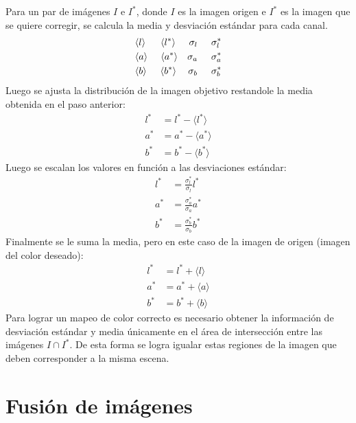 Para un par de imágenes $I$ e $I^*$, donde $I$ es la imagen origen e $I^*$ es la imagen que se quiere corregir, se calcula la media y desviación estándar para cada canal.
\begin{align*}
&{\langle l \rangle} \hspace{0.55cm} {\langle l^* \rangle}  &{ \sigma_l } \hspace{0.5cm} { \sigma^*_l } \\
&{\langle a \rangle} \hspace{0.48cm} {\langle a^* \rangle}  &{ \sigma_a } \hspace{0.5cm} { \sigma^*_a }  \\
&{\langle b \rangle} \hspace{0.5cm} {\langle b^* \rangle}  &{ \sigma_b } \hspace{0.5cm} { \sigma^*_b } 
\end{align*}
Luego se ajusta la distribución de la imagen objetivo restandole la media obtenida en el paso anterior:
\begin{align*}
l^* &= l^* - \langle l^* \rangle \\
a^* &= a^* - \langle a^* \rangle \\
b^* &= b^* - \langle b^* \rangle
\end{align*}
Luego se escalan los valores en función a las desviaciones estándar:
\begin{align*}
l^* &= \frac{\sigma^*_l}{\sigma_l} l^* \\
a^* &= \frac{\sigma^*_a}{\sigma_a} a^* \\
b^* &= \frac{\sigma^*_b}{\sigma_b} b^*
\end{align*}
Finalmente se le suma la media, pero en este caso de la imagen de origen (imagen del color deseado):
\begin{align*}
l^* &= l^* + \langle l \rangle \\
a^* &= a^* + \langle a \rangle \\
b^* &= b^* + \langle b \rangle
\end{align*}
Para lograr un mapeo de color correcto es necesario obtener la información de desviación estándar y media únicamente en el área de intersección entre las imágenes $I\cap I^*$. De esta forma se logra igualar estas regiones de la imagen que deben corresponder a la misma escena.


\section{Fusión de imágenes}\label{seccion-fusion}

